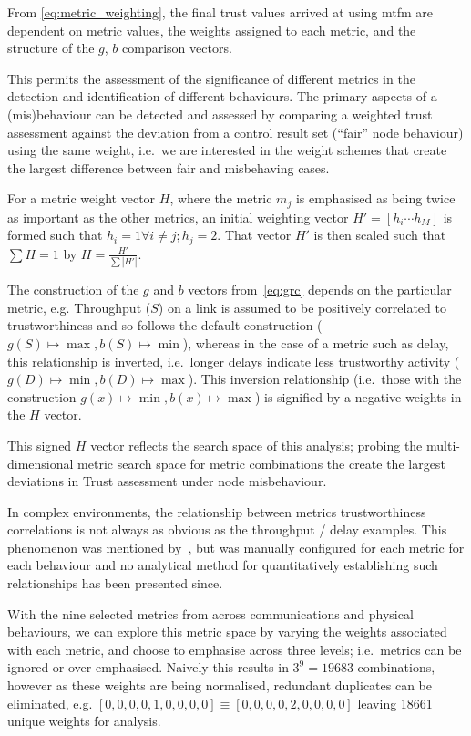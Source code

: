 From \autoref{eq:metric_weighting}, the final trust values arrived at using \gls{mtfm} are dependent on metric values, the weights assigned to each metric, and the structure of the $g$, $b$ comparison vectors.

This permits the assessment of the significance of different metrics in the detection and identification of different behaviours. 
The primary aspects of a (mis)behaviour can be detected and assessed by comparing a weighted trust assessment against the deviation from a control result set (``fair'' node behaviour) using the same weight, i.e.\ we are interested in the weight schemes that create the largest difference between fair and misbehaving cases.

For a metric weight vector $H$, where the metric $m_j$ is emphasised as being twice as important as the other metrics, an initial weighting vector $H'=[h_i\cdots h_M]$ is formed such that $h_i = 1 \forall i \ne j; h_j=2$. 
That vector $H'$ is then scaled such that $\sum H = 1$ by $H= \frac{H'}{\sum |H'|}$.

The construction of the $g$ and $b$ vectors from~\autoref{eq:grc} depends on the particular metric, e.g. Throughput ($S$) on a link is assumed to be positively correlated to trustworthiness and so follows the default construction ($g(S) \mapsto \max, b(S) \mapsto \min$), whereas in the case of a metric such as delay, this relationship is inverted, i.e.\ longer delays indicate less trustworthy activity ($g(D) \mapsto \min, b(D) \mapsto \max$).
This inversion relationship (i.e.\ those with the construction $g(x) \mapsto \min, b(x) \mapsto \max$) is signified by a negative weights in the $H$ vector.

This signed $H$ vector reflects the search space of this analysis; probing the multi-dimensional metric search space for metric combinations the create the largest deviations in Trust assessment under node misbehaviour.

In complex environments, the relationship between metrics trustworthiness correlations is not always as obvious as the throughput / delay examples.
This phenomenon was mentioned by~\citet{Guo2012}, but was manually configured for each metric for each behaviour and no analytical method for quantitatively establishing such relationships has been presented since.

With the nine selected metrics from across communications and physical behaviours, we can explore this metric space by varying the weights associated with each metric, and choose to emphasise across three levels; i.e.\ metrics can be ignored or over-emphasised. Naively this results in $3^9 = 19683$ combinations, however as these weights are being normalised, redundant duplicates can be eliminated, e.g. $[0,0,0,0,1,0,0,0,0] \equiv [0,0,0,0,2,0,0,0,0]$ leaving 18661 unique weights for analysis.

